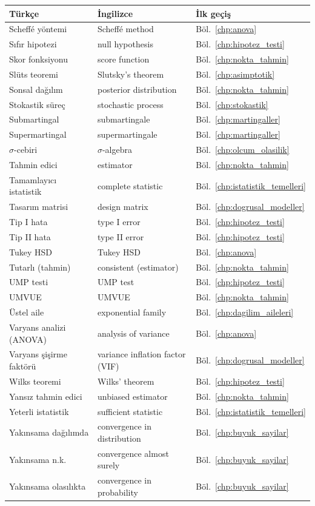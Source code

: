 \begin{tabular}{p{5cm}p{5cm}p{4cm}}
\hline
\textbf{Türkçe} & \textbf{İngilizce} & \textbf{İlk geçiş} \\
\hline
Scheffé yöntemi & Scheffé method & Böl.~\ref{chp:anova} \\
Sıfır hipotezi & null hypothesis & Böl.~\ref{chp:hipotez_testi} \\
Skor fonksiyonu & score function & Böl.~\ref{chp:nokta_tahmin} \\
Slüts teoremi & Slutsky's theorem & Böl.~\ref{chp:asimptotik} \\
Sonsal dağılım & posterior distribution & Böl.~\ref{chp:nokta_tahmin} \\
Stokastik süreç & stochastic process & Böl.~\ref{chp:stokastik} \\
Submartingal & submartingale & Böl.~\ref{chp:martingaller} \\
Supermartingal & supermartingale & Böl.~\ref{chp:martingaller} \\
$\sigma$-cebiri & $\sigma$-algebra & Böl.~\ref{chp:olcum_olasilik} \\
Tahmin edici & estimator & Böl.~\ref{chp:nokta_tahmin} \\
Tamamlayıcı istatistik & complete statistic & Böl.~\ref{chp:istatistik_temelleri} \\
Tasarım matrisi & design matrix & Böl.~\ref{chp:dogrusal_modeller} \\
Tip I hata & type I error & Böl.~\ref{chp:hipotez_testi} \\
Tip II hata & type II error & Böl.~\ref{chp:hipotez_testi} \\
Tukey HSD & Tukey HSD & Böl.~\ref{chp:anova} \\
Tutarlı (tahmin) & consistent (estimator) & Böl.~\ref{chp:nokta_tahmin} \\
UMP testi & UMP test & Böl.~\ref{chp:hipotez_testi} \\
UMVUE & UMVUE & Böl.~\ref{chp:nokta_tahmin} \\
Üstel aile & exponential family & Böl.~\ref{chp:dagilim_aileleri} \\
Varyans analizi (ANOVA) & analysis of variance & Böl.~\ref{chp:anova} \\
Varyans şişirme faktörü & variance inflation factor (VIF) & Böl.~\ref{chp:dogrusal_modeller} \\
Wilks teoremi & Wilks' theorem & Böl.~\ref{chp:hipotez_testi} \\
Yansız tahmin edici & unbiased estimator & Böl.~\ref{chp:nokta_tahmin} \\
Yeterli istatistik & sufficient statistic & Böl.~\ref{chp:istatistik_temelleri} \\
Yakınsama dağılımda & convergence in distribution & Böl.~\ref{chp:buyuk_sayilar} \\
Yakınsama n.k. & convergence almost surely & Böl.~\ref{chp:buyuk_sayilar} \\
Yakınsama olasılıkta & convergence in probability & Böl.~\ref{chp:buyuk_sayilar} \\
\hline
\end{tabular}

